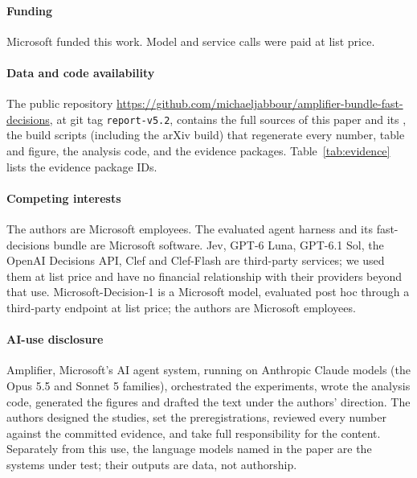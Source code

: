 \documentclass[11pt,letterpaper]{article}
\newcommand{\StTab}[1]{Table~\ref{#1}}
\begin{document}
\paragraph{Funding} Microsoft funded this work. Model and service calls were paid at list price.

\paragraph{Data and code availability} The public repository
\url{https://github.com/michaeljabbour/amplifier-bundle-fast-decisions}, at git tag \texttt{report-v5.2}, contains the
full sources of this paper and its \suppword{}, the build scripts (including the arXiv build) that regenerate every number,
table and figure, the analysis code, and the evidence packages. \StTab{tab:evidence} lists the evidence package IDs.

\paragraph{Competing interests} The authors are Microsoft employees. The evaluated agent harness and its
fast-decisions bundle are Microsoft software. Jev, GPT-6 Luna, GPT-6.1 Sol, the OpenAI Decisions API, Clef and
Clef-Flash are third-party services; we used them at list price and have no financial relationship with their
providers beyond that use. Microsoft-Decision-1 is a Microsoft model, evaluated post hoc through a third-party
endpoint at list price; the authors are Microsoft employees.

\paragraph{AI-use disclosure} Amplifier, Microsoft's AI agent system, running on Anthropic Claude models (the Opus 5.5
and Sonnet 5 families), orchestrated the experiments, wrote the analysis code, generated the figures and drafted the
text under the authors' direction. The authors designed the studies, set
the preregistrations, reviewed every number against the committed evidence, and take full responsibility for the
content. Separately from this use, the language models named in the paper are the systems under test; their outputs
are data, not authorship.
\par
{\small\raggedright


\par}
 \clearpage
\appendix
{}
\renewcommand{\thefigure}{\thesection.\arabic{figure}}
\renewcommand{\thetable}{\thesection.\arabic{table}}
\end{document}
